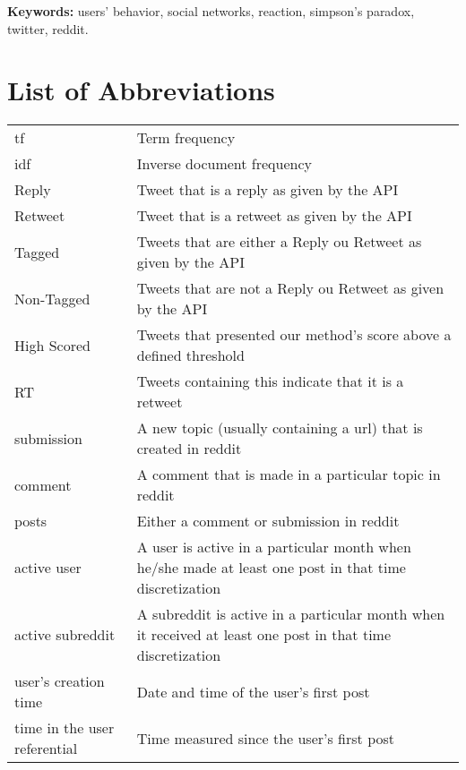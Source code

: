 \documentclass[11pt,twoside,a4paper]{book}
\begin{document}
\noindent \textbf{Keywords:} users' behavior, social networks, reaction, simpson's paradox, twitter, reddit.

\tableofcontents    %

\chapter{List of Abbreviations}
\begin{table}[htbp]
	\begin{tabular}{>{\raggedright\arraybackslash}m{5cm}m{11cm}}
					 tf  				 & Term frequency \\
					 idf         & Inverse document frequency \\
					 Reply 			 & Tweet that is a reply as given by the API \\
					 Retweet 			 & Tweet that is a retweet as given by the API \\
					 Tagged         & Tweets that are either a Reply ou Retweet as given by the API \\
					 Non-Tagged         & Tweets that are not a Reply ou Retweet as given by the API \\
					 High Scored         & Tweets that presented our method's score above a defined threshold \\
					 RT         & Tweets containing this indicate that it is a retweet \\
					 submission         & A new topic (usually containing a url) that is created in reddit \\
					 comment         & A comment that is made in a particular topic in reddit \\
					 posts         & Either a comment or submission in reddit \\
					 active user         & A user is active in a particular month when he/she made at least one post in that time discretization \\
					 active subreddit         & A subreddit is active in a particular month when it received at least one post in that time discretization \\
					 user's creation time         & Date and time of the user's first post \\
					 time in the user referential         & Time measured since the user's first post \\
	\end{tabular}
\end{table}
\end{document}
